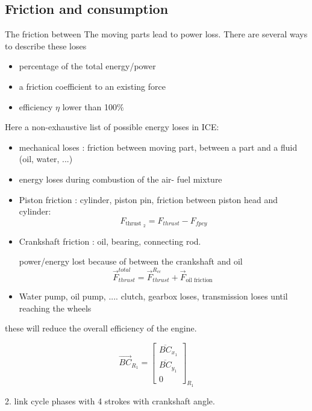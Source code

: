 \documentclass[12pt,a4paper]{article}
\begin{document}
	\subsection{Friction and consumption}
	The friction between The moving parts lead to power loss. 
	There are several ways to describe these loses 
	\begin{itemize}
		\item percentage of the total energy/power
		\item a friction coefficient to an existing force
		\item efficiency $\eta$ lower than 100$\%$
	\end{itemize}
	
	Here a non-exhaustive list of possible energy loses in ICE:
	\begin{itemize}
		\item mechanical loses : friction between moving part, between a part and a fluid (oil, water, ...)
		\item energy loses during combustion of the air- fuel mixture
		\item Piston friction : cylinder, piston pin,
		friction between piston head and cylinder:
	\begin{equation*}
		F_{\text {thrust }_{2}}=F_{thrust }-F_{fpcy} \tag{4}
	\end{equation*}
		\item Crankshaft friction : oil, bearing, connecting rod.
		
		power/energy lost because of between the crankshaft and oil
		\begin{equation*}
			\vec{F}_{thrust}^{total}=\vec{F}_{thrust}^{R_{c c}}+\vec{F}_{\text{oil friction }} \tag{6}
		\end{equation*}
		\item Water pump, oil pump, .... clutch, gearbox loses, transmission loses until reaching the wheels
	\end{itemize}
	these will reduce the overall efficiency of the engine.
	
	
	
	
	
	\[
	\overrightarrow{B C}_{R_{1}}=\left[\begin{array}{c}
		\overline{B C}_{x_{1}}  \tag{10}\\
		\overline{B C}_{y_{1}} \\
		0
	\end{array}\right]_{R_{1}}
	\]
	
	
	2. link cycle phases with 4 strokes with crankshaft angle. 
\end{document}
